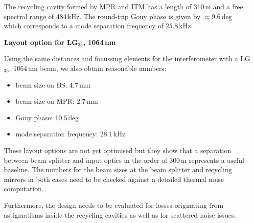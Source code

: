 The recycling cavity formed by MPR and ITM has a length of
310\,m and a free spectral range of 484\,kHz. The round-trip Gouy phase
is given by $\approx 9.6$\,deg which
corresponds to a mode separation frequency of $25.8$\,kHz.

\textbf{Layout option for LG$_{33}$, 1064\,nm}
\nopagebreak

Using the same distances and focussing elements for the interferometer
with a LG$_{33}$, 1064\,nm beam, we also obtain reasonable numbers:
\begin{itemize}
\item beam size on BS: 4.7\,mm
\item beam size on MPR: 2.7\,mm
\item Gouy phase: 10.5\,deg
\item mode separation frequency:  28.1\,kHz
\end{itemize}

These layout options are not yet optimised but they show that a
separation between beam splitter and input optics in the order of 300\,m
represents a useful baseline. The numbers for the beam sizes at the
beam splitter and recycling mirrors in both cases need to be checked against a
detailed thermal noise computation.

Furthermore, the design needs to be evaluated for losses originating
from astigmatisms inside the recycling cavities as well as for scattered
noise issues.


